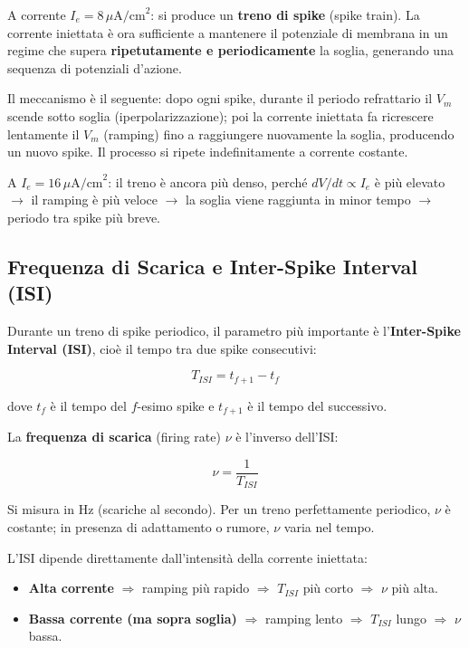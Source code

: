 A corrente $I_e = 8 \, \mu\text{A/cm}^2$: si produce un \textbf{treno di spike} (spike train). La corrente iniettata è ora sufficiente a mantenere il potenziale di membrana in un regime che supera \textbf{ripetutamente e periodicamente} la soglia, generando una sequenza di potenziali d'azione.

Il meccanismo è il seguente: dopo ogni spike, durante il periodo refrattario il $V_m$ scende sotto soglia (iperpolarizzazione); poi la corrente iniettata fa ricrescere lentamente il $V_m$ (ramping) fino a raggiungere nuovamente la soglia, producendo un nuovo spike. Il processo si ripete indefinitamente a corrente costante.

A $I_e = 16 \, \mu\text{A/cm}^2$: il treno è ancora più denso, perché $dV/dt \propto I_e$ è più elevato $\rightarrow$ il ramping è più veloce $\rightarrow$ la soglia viene raggiunta in minor tempo $\rightarrow$ periodo tra spike più breve.


\subsection{Frequenza di Scarica e Inter-Spike Interval (ISI)}

Durante un treno di spike periodico, il parametro più importante è l'\textbf{Inter-Spike Interval (ISI)}, cioè il tempo tra due spike consecutivi:

\begin{equation}
T_{ISI} = t_{f+1} - t_f
\end{equation}

dove $t_f$ è il tempo del $f$-esimo spike e $t_{f+1}$ è il tempo del successivo.

La \textbf{frequenza di scarica} (firing rate) $\nu$ è l'inverso dell'ISI:

\begin{equation}
\nu = \frac{1}{T_{ISI}}
\end{equation}

Si misura in Hz (scariche al secondo). Per un treno perfettamente periodico, $\nu$ è costante; in presenza di adattamento o rumore, $\nu$ varia nel tempo.



L'ISI dipende direttamente dall'intensità della corrente iniettata:
\begin{itemize}
    \item \textbf{Alta corrente} $\Rightarrow$ ramping più rapido $\Rightarrow$ $T_{ISI}$ più corto $\Rightarrow$ $\nu$ più alta.
    \item \textbf{Bassa corrente (ma sopra soglia)} $\Rightarrow$ ramping lento $\Rightarrow$ $T_{ISI}$ lungo $\Rightarrow$ $\nu$ bassa.
\end{itemize}

